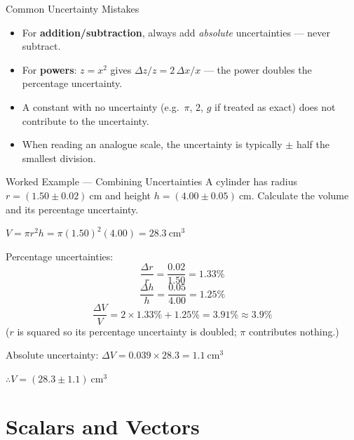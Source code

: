 \begin{warningbox}{Common Uncertainty Mistakes}
\begin{itemize}[itemsep=2pt]
  \item For \textbf{addition/subtraction}, always add \emph{absolute} uncertainties — never subtract.
  \item For \textbf{powers}: $z = x^2$ gives $\Delta z / z = 2\,\Delta x/x$ — the power doubles the percentage uncertainty.
  \item A constant with no uncertainty (e.g.\ $\pi$, $2$, $g$ if treated as exact) does not contribute to the uncertainty.
  \item When reading an analogue scale, the uncertainty is typically $\pm$ half the smallest division.
\end{itemize}
\end{warningbox}

\begin{examplebox}{Worked Example — Combining Uncertainties}
A cylinder has radius $r = (1.50 \pm 0.02)\ \text{cm}$ and height $h = (4.00 \pm 0.05)\ \text{cm}$. Calculate the volume and its percentage uncertainty.

$V = \pi r^2 h = \pi (1.50)^2(4.00) = 28.3\ \text{cm}^3$

Percentage uncertainties:
$$\frac{\Delta r}{r} = \frac{0.02}{1.50} = 1.33\%$$
$$\frac{\Delta h}{h} = \frac{0.05}{4.00} = 1.25\%$$
$$\frac{\Delta V}{V} = 2\times1.33\% + 1.25\% = 3.91\% \approx \mathbf{3.9\%}$$
($r$ is squared so its percentage uncertainty is doubled; $\pi$ contributes nothing.)

Absolute uncertainty: $\Delta V = 0.039 \times 28.3 = 1.1\ \text{cm}^3$

$\therefore V = (28.3 \pm 1.1)\ \text{cm}^3$
\end{examplebox}

\section{Scalars and Vectors}

